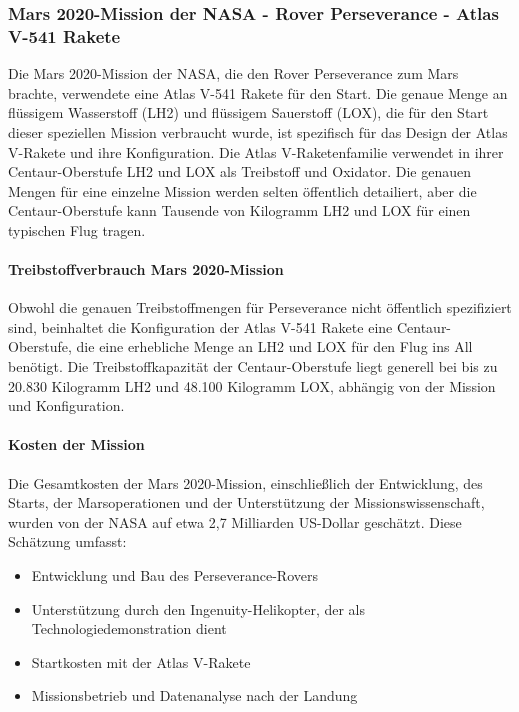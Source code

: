 \documentclass{vorlage-design-main}
\begin{document}
\hypertarget{mars-2020-mission-der-nasa---rover-perseverance---atlas-v-541-rakete}{%
\subsubsection{Mars 2020-Mission der NASA - Rover Perseverance - Atlas
V-541
Rakete}\label{mars-2020-mission-der-nasa---rover-perseverance---atlas-v-541-rakete}}

Die Mars 2020-Mission der NASA, die den Rover Perseverance zum Mars
brachte, verwendete eine Atlas V-541 Rakete für den Start. Die genaue
Menge an flüssigem Wasserstoff (LH2) und flüssigem Sauerstoff (LOX), die
für den Start dieser speziellen Mission verbraucht wurde, ist spezifisch
für das Design der Atlas V-Rakete und ihre Konfiguration. Die Atlas
V-Raketenfamilie verwendet in ihrer Centaur-Oberstufe LH2 und LOX als
Treibstoff und Oxidator. Die genauen Mengen für eine einzelne Mission
werden selten öffentlich detailiert, aber die Centaur-Oberstufe kann
Tausende von Kilogramm LH2 und LOX für einen typischen Flug tragen.

\hypertarget{treibstoffverbrauch-mars-2020-mission}{%
\paragraph{Treibstoffverbrauch Mars
2020-Mission}\label{treibstoffverbrauch-mars-2020-mission}}

Obwohl die genauen Treibstoffmengen für Perseverance nicht öffentlich
spezifiziert sind, beinhaltet die Konfiguration der Atlas V-541 Rakete
eine Centaur-Oberstufe, die eine erhebliche Menge an LH2 und LOX für den
Flug ins All benötigt. Die Treibstoffkapazität der Centaur-Oberstufe
liegt generell bei bis zu 20.830 Kilogramm LH2 und 48.100 Kilogramm LOX,
abhängig von der Mission und Konfiguration.

\hypertarget{kosten-der-mission}{%
\paragraph{Kosten der Mission}\label{kosten-der-mission}}

Die Gesamtkosten der Mars 2020-Mission, einschließlich der Entwicklung,
des Starts, der Marsoperationen und der Unterstützung der
Missionswissenschaft, wurden von der NASA auf etwa 2,7 Milliarden
US-Dollar geschätzt. Diese Schätzung umfasst:

\begin{itemize}

\item
  Entwicklung und Bau des Perseverance-Rovers
\item
  Unterstützung durch den Ingenuity-Helikopter, der als
  Technologiedemonstration dient
\item
  Startkosten mit der Atlas V-Rakete
\item
  Missionsbetrieb und Datenanalyse nach der Landung
\end{itemize}
\end{document}
